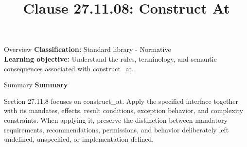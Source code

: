 \documentclass[10pt,letterpaper]{article}
\title{Clause 27.11.08: Construct At}
\author{}
\date{}
\begin{document}
\maketitle
\begin{CornellOverviewBox}{Overview}
\textbf{Classification:} Standard library - Normative\\[2pt]
\textbf{Learning objective:} Understand the rules, terminology, and semantic consequences associated with construct\_at.
\end{CornellOverviewBox}\begin{CornellSummaryBox}{Summary}
{\sffamily\bfseries\color{Accent} Summary}\par\vspace{3pt}Section 27.11.8 focuses on construct\_at. Apply the specified interface together with its mandates, effects, result conditions, exception behavior, and complexity constraints. When applying it, preserve the distinction between mandatory requirements, recommendations, permissions, and behavior deliberately left undefined, unspecified, or implementation-defined.
\end{CornellSummaryBox}
\end{document}

